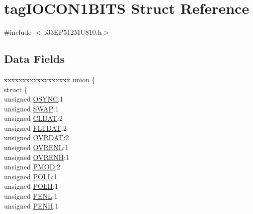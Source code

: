 \hypertarget{structtag_i_o_c_o_n1_b_i_t_s}{}\section{tag\+I\+O\+C\+O\+N1\+B\+I\+TS Struct Reference}
\label{structtag_i_o_c_o_n1_b_i_t_s}


{\ttfamily \#include $<$p33\+E\+P512\+M\+U810.\+h$>$}

\subsection*{Data Fields}
\begin{DoxyCompactItemize}
\item 
\begin{tabbing}
xx\=xx\=xx\=xx\=xx\=xx\=xx\=xx\=xx\=\kill
union \{\\
\>struct \{\\
\>\>unsigned \hyperlink{structtag_i_o_c_o_n1_b_i_t_s_aee7f35d5d04fcd5202b9d569e0d08146}{OSYNC}:1\\
\>\>unsigned \hyperlink{structtag_i_o_c_o_n1_b_i_t_s_a3ed0654ceb192d32e26d2929c9b8dcc2}{SWAP}:1\\
\>\>unsigned \hyperlink{structtag_i_o_c_o_n1_b_i_t_s_a5bcbfaa85bc9c3349fb4e269aa308899}{CLDAT}:2\\
\>\>unsigned \hyperlink{structtag_i_o_c_o_n1_b_i_t_s_afcc1e84f8b5860ae56a567b5de96af73}{FLTDAT}:2\\
\>\>unsigned \hyperlink{structtag_i_o_c_o_n1_b_i_t_s_a6d82e38a9acf634763a64a6876f58d3d}{OVRDAT}:2\\
\>\>unsigned \hyperlink{structtag_i_o_c_o_n1_b_i_t_s_a2e98ef1aea75144311343faf9f705f2d}{OVRENL}:1\\
\>\>unsigned \hyperlink{structtag_i_o_c_o_n1_b_i_t_s_a0e87b6433e91b1b0d550e9419e22b408}{OVRENH}:1\\
\>\>unsigned \hyperlink{structtag_i_o_c_o_n1_b_i_t_s_a4a7369a55430f3368fb601d87d479553}{PMOD}:2\\
\>\>unsigned \hyperlink{structtag_i_o_c_o_n1_b_i_t_s_a269dd0694f25a7b4dd065f3570e09b5e}{POLL}:1\\
\>\>unsigned \hyperlink{structtag_i_o_c_o_n1_b_i_t_s_a21a3881dcaa3ce8bccd5d9906aee8e55}{POLH}:1\\
\>\>unsigned \hyperlink{structtag_i_o_c_o_n1_b_i_t_s_af777eadaa0b86bb09cad6117a36e15aa}{PENL}:1\\
\>\>unsigned \hyperlink{structtag_i_o_c_o_n1_b_i_t_s_a91f04ec56f33e5a2e402f3817a44e91d}{PENH}:1\\

\end{tabbing}
\end{DoxyCompactItemize}
